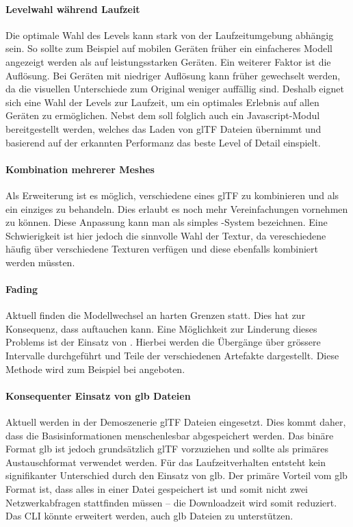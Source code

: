 \paragraph{Levelwahl während Laufzeit}
Die optimale Wahl des Levels kann stark von der Laufzeitumgebung abhängig sein. So sollte zum Beispiel auf mobilen Geräten früher ein einfacheres Modell angezeigt werden als auf leistungsstarken Geräten. Ein weiterer Faktor ist die Auflösung. Bei Geräten mit niedriger Auflösung kann früher gewechselt werden, da die visuellen Unterschiede zum Original weniger auffällig sind.
Deshalb eignet sich eine Wahl der Levels zur Laufzeit, um ein optimales Erlebnis auf allen Geräten zu ermöglichen.
Nebst dem  soll folglich auch ein Javascript-Modul bereitgestellt werden, welches das Laden von glTF Dateien übernimmt und basierend auf der erkannten Performanz das beste Level of Detail einspielt.

\paragraph{Kombination mehrerer Meshes}
Als Erweiterung ist es möglich, verschiedene  eines glTF zu kombinieren und als ein einziges  zu behandeln. Dies erlaubt es noch mehr Vereinfachungen vornehmen zu können. Diese Anpassung kann man als simples -System bezeichnen. Eine Schwierigkeit ist hier jedoch die sinnvolle Wahl der Textur, da vereschiedene  häufig über verschiedene Texturen verfügen und diese ebenfalls kombiniert werden müssten.

\paragraph{Fading}
\label{chap:fading}
Aktuell finden die Modellwechsel an harten Grenzen statt. Dies hat zur Konsequenz, dass  auftauchen kann. Eine Möglichkeit zur Linderung dieses Problems ist der Einsatz von . Hierbei werden die Übergänge über grössere Intervalle durchgeführt und Teile der verschiedenen Artefakte dargestellt. Diese Methode wird zum Beispiel bei  angeboten.

\paragraph{Konsequenter Einsatz von glb Dateien}
Aktuell werden in der Demoszenerie glTF Dateien eingesetzt. Dies kommt daher, dass die Basisinformationen menschenlesbar abgespeichert werden. Das binäre Format glb ist jedoch grundsätzlich glTF vorzuziehen und sollte als primäres Austauschformat verwendet werden. Für das Laufzeitverhalten entsteht kein signifikanter Unterschied durch den Einsatz von glb. Der primäre Vorteil vom glb Format ist, dass alles in einer Datei gespeichert ist und somit nicht zwei Netzwerkabfragen stattfinden müssen – die Download\-zeit wird somit reduziert. Das CLI könnte erweitert werden, auch glb Dateien zu unterstützen.
